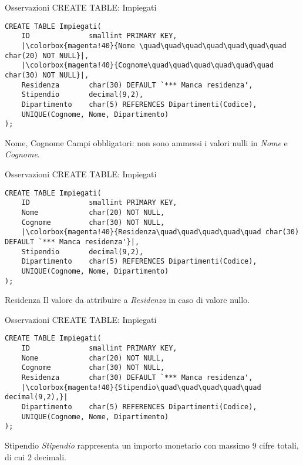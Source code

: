 %
\begin{frame}[fragile]{Osservazioni CREATE TABLE: Impiegati}
\begin{lstlisting}
CREATE TABLE Impiegati(
    ID              smallint PRIMARY KEY,
    |\colorbox{magenta!40}{Nome \quad\quad\quad\quad\quad\quad\quad char(20) NOT NULL}|,
    |\colorbox{magenta!40}{Cognome\quad\quad\quad\quad\quad\quad char(30) NOT NULL}|,
    Residenza       char(30) DEFAULT `*** Manca residenza',
    Stipendio       decimal(9,2),
    Dipartimento    char(5) REFERENCES Dipartimenti(Codice),
    UNIQUE(Cognome, Nome, Dipartimento)
);
\end{lstlisting}
\begin{block}{Nome, Cognome}
    Campi obbligatori: non sono ammessi i valori nulli in \textit{Nome} e \textit{Cognome}.
\end{block}
\end{frame}
%
\begin{frame}[fragile]{Osservazioni CREATE TABLE: Impiegati}
\begin{lstlisting}
CREATE TABLE Impiegati(
    ID              smallint PRIMARY KEY,
    Nome            char(20) NOT NULL,
    Cognome         char(30) NOT NULL,
    |\colorbox{magenta!40}{Residenza\quad\quad\quad\quad\quad char(30) DEFAULT `*** Manca residenza'}|,
    Stipendio       decimal(9,2),
    Dipartimento    char(5) REFERENCES Dipartimenti(Codice),
    UNIQUE(Cognome, Nome, Dipartimento)
);
\end{lstlisting}
\begin{minipage}{0.7\textwidth}
\begin{block}{Residenza}
    Il valore da attribuire a \textit{Residenza} in caso di valore nullo.
\end{block}
\end{minipage}
\end{frame}
%
\begin{frame}[fragile]{Osservazioni CREATE TABLE: Impiegati}
\begin{lstlisting}
CREATE TABLE Impiegati(
    ID              smallint PRIMARY KEY,
    Nome            char(20) NOT NULL,
    Cognome         char(30) NOT NULL,
    Residenza       char(30) DEFAULT `*** Manca residenza',
    |\colorbox{magenta!40}{Stipendio\quad\quad\quad\quad\quad decimal(9,2),}|
    Dipartimento    char(5) REFERENCES Dipartimenti(Codice),
    UNIQUE(Cognome, Nome, Dipartimento)
);
\end{lstlisting}
\begin{minipage}{\textwidth}
\begin{block}{Stipendio}
    \textit{Stipendio} rappresenta un importo monetario con massimo 9 cifre totali, di cui 2 decimali.
\end{block}
\end{minipage}
\end{frame}
